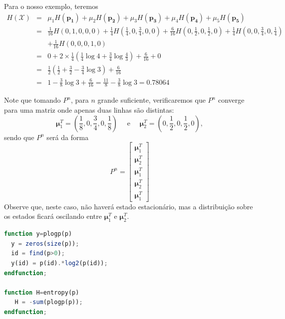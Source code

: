 \begin{questions}
\begin{solution}
\begin{parts}
Para o nosso exemplo, teremos
\begin{eqnarray}
  H(\mathcal{X}) &=& \mu_1 H(\mathbf{p_1}) + \mu_2 H(\mathbf{p_2}) + \mu_3 H(\mathbf{p_3}) +
        \mu_4 H(\mathbf{p_4}) + \mu_5 H(\mathbf{p_5}) \nonumber \\
        &=& \frac{1}{16} H(0,1,0,0,0) + \frac{1}{4} H(\frac{1}{4}, 0, \frac{3}{4}, 0, 0) + 
                \frac{6}{16} H(0, \frac{1}{2}, 0, \frac{1}{2}, 0) + 
                \frac{1}{4} H(0, 0, \frac{3}{4}, 0, \frac{1}{4}) \nonumber \\
	    && + \frac{1}{16} H(0, 0, 0, 1, 0) \nonumber \\
        &=& 0 + 2 \times \frac{1}{4} \left( \frac{1}{4} \log 4 + \frac{3}{4} \log \frac{4}{3} \right) +
                \frac{6}{16} + 0 \nonumber \\
        &=& \frac{1}{2} \left( \frac{1}{2} + \frac{3}{2} - \frac{3}{4} \log 3  \right) + \frac{6}{16} \nonumber \\
        &=& 1 - \frac{3}{8} \log 3 + \frac{6}{16} = \frac{11}{8} - \frac{3}{8} \log 3 = 0.78064
\end{eqnarray}


Note que tomando $P^n$, para $n$ grande suficiente, verificaremos que $P^n$ converge
para uma matriz onde apenas duas linhas são distintas:
\begin{equation}
\mathbf{\mu}_1^T = \left( \frac{1}{8}, 0, \frac{3}{4}, 0, \frac{1}{8} \right) \quad \text{ e } \quad 
\mathbf{\mu}_2^T = \left(0, \frac{1}{2}, 0, \frac{1}{2}, 0 \right) ,
\end{equation}
sendo que $P^n$ será da forma
\begin{equation}
P^n = \begin{bmatrix} \mathbf{\mu}_1^T \\ \mathbf{\mu}_2^T \\ \mathbf{\mu}_1^T \\ \mathbf{\mu}_2^T \\ \mathbf{\mu}_1^T \end{bmatrix}
\end{equation}
Observe que, neste caso, não haverá estado estacionário, mas a distribuição sobre os estados
ficará oscilando entre $\mathbf{\mu}_1^T$ e $\mathbf{\mu}_2^T$.

\begin{lstlisting}[language=Octave]
function y=plogp(p)
  y = zeros(size(p));
  id = find(p>0);
  y(id) = p(id).*log2(p(id));
endfunction;

function H=entropy(p)
   H = -sum(plogp(p));
endfunction;


\end{lstlisting}
\end{parts}
\end{solution}
\end{questions}
